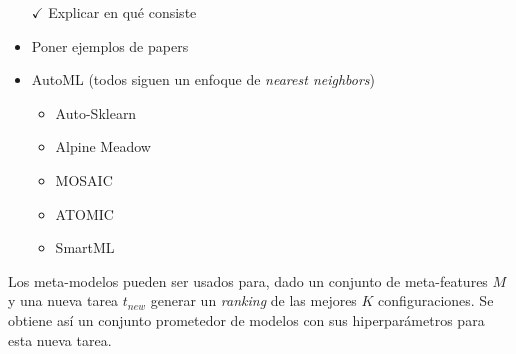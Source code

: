 \begin{itemize}
	\item[$\checkmark$] Explicar en qué consiste
	\item Poner ejemplos de papers
	\item AutoML (todos siguen un enfoque de \textit{nearest neighbors}) \begin{itemize}
		\item Auto-Sklearn
		\item Alpine Meadow
		\item MOSAIC
		\item ATOMIC
		\item SmartML
	\end{itemize}
\end{itemize}

\quad


Los meta-modelos pueden ser usados para, dado un conjunto de meta-features $M$ y una nueva tarea $t_{new}$ generar un \textit{ranking} de las mejores $K$ configuraciones. Se obtiene así un conjunto prometedor de modelos con sus hiperparámetros para esta nueva tarea.
 
